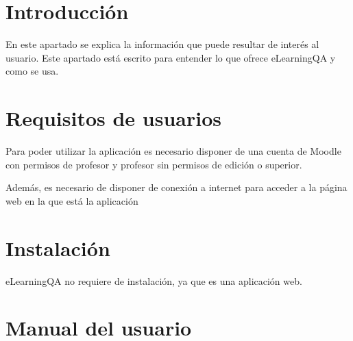 
\section{Introducción}
En este apartado se explica la información que puede resultar de interés al usuario. Este apartado está escrito para entender lo que ofrece eLearningQA y como se usa.
\section{Requisitos de usuarios}
Para poder utilizar la aplicación es necesario disponer de una cuenta de Moodle con permisos de profesor y profesor sin permisos de edición o superior.

Además, es necesario de disponer de conexión a internet para acceder a la página web en la que está la aplicación
\section{Instalación}
eLearningQA no requiere de instalación, ya que es una aplicación web.
\section{Manual del usuario}
